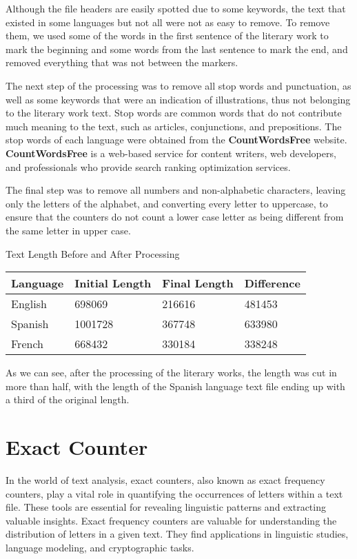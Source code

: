 \documentclass[]{revdetua}
\begin{document}
Although the file headers are easily spotted due to some keywords, the text that existed in some languages but not all were not as easy to remove. To remove them, we used some of the words in the first sentence of the literary work to mark the beginning and some words from the last sentence to mark the end, and removed everything that was not between the markers.

The next step of the processing was to remove all stop words and punctuation, as well as some keywords that were an indication of illustrations, thus not belonging to the literary work text. Stop words are common words that do not contribute much meaning to the text, such as articles, conjunctions, and prepositions. The stop words of each language were obtained from the \textbf{CountWordsFree} website. \textbf{CountWordsFree} is a web-based service for content writers, web developers, and professionals who provide search ranking optimization services.

The final step was to remove all numbers and non-alphabetic characters, leaving only the letters of the alphabet, and converting every letter to uppercase, to ensure that the counters do not count a lower case letter as being different from the same letter in upper case.

\begin{table}[!ht]
    \centering
    Text Length Before and After Processing
    \begin{tabular}{|l|l|l|l|}
    \hline
        Language & Initial Length & Final Length & Difference \\ \hline
        English & 698069 & 216616 & 481453 \\ \hline
        Spanish & 1001728 & 367748 & 633980 \\ \hline
        French & 668432 & 330184 & 338248 \\ \hline
    \end{tabular}
\end{table}

As we can see, after the processing of the literary works, the length was cut in more than half, with the length of the Spanish language text file ending up with a third of the original length. 

\section{Exact Counter}

In the world of text analysis, exact counters, also known as exact frequency counters, play a vital role in quantifying the occurrences of letters within a text file. These tools are essential for revealing linguistic patterns and extracting valuable insights. Exact frequency counters are valuable for understanding the distribution of letters in a given text. They find applications in linguistic studies, language modeling, and cryptographic tasks.
\end{document}
